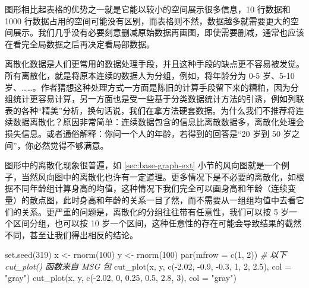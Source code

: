 \documentclass[
  b5paper,
  UTF8,twoside]{book}
\newenvironment{Shaded}{\begin{snugshade}}{\end{snugshade}}
\newcommand{\AttributeTok}[1]{\textcolor[rgb]{0.77,0.63,0.00}{#1}}
\newcommand{\CommentTok}[1]{\textcolor[rgb]{0.56,0.35,0.01}{\textit{#1}}}
\newcommand{\DecValTok}[1]{\textcolor[rgb]{0.00,0.00,0.81}{#1}}
\newcommand{\FloatTok}[1]{\textcolor[rgb]{0.00,0.00,0.81}{#1}}
\newcommand{\FunctionTok}[1]{\textcolor[rgb]{0.00,0.00,0.00}{#1}}
\newcommand{\NormalTok}[1]{#1}
\newcommand{\OtherTok}[1]{\textcolor[rgb]{0.56,0.35,0.01}{#1}}
\newcommand{\SpecialCharTok}[1]{\textcolor[rgb]{0.00,0.00,0.00}{#1}}
\newcommand{\StringTok}[1]{\textcolor[rgb]{0.31,0.60,0.02}{#1}}
\begin{document}
图形相比起表格的优势之一就是它能以较小的空间展示很多信息，10 行数据和 1000 行数据占用的空间可能没有区别，而表格则不然，数据越多就需要更大的空间展示。我们几乎没有必要刻意删减原始数据再画图，即使需要删减，通常也应该在看完全局数据之后再决定看局部数据。

离散化数据是人们更常用的数据处理手段，并且这种手段的缺点更不容易被发觉。所有离散化，就是将原本连续的数据人为分组，例如，将年龄分为 0-5 岁、5-10 岁、\ldots\ldots。作者猜想这种处理方式一方面是陈旧的计算手段留下来的糟粕，因为分组统计更容易计算，另一方面也是受一些基于分类数据统计方法的引诱，例如列联表的各种``精美''分析，换句话说，我们在拿方法硬套数据。为什么我们不推荐将连续数据离散化？原因非常简单：连续数据包含的信息比离散数据多，离散化处理会损失信息。或者通俗解释：你问一个人的年龄，若得到的回答是``20 岁到 50 岁之间''，你必然觉得不够满意。

图形中的离散化现象很普遍，如 \ref{sec:base-graph-ext} 小节的风向图就是一个例子，当然风向图中的离散化也许有一定道理。更多情况下是不必要的离散化，如根据不同年龄组计算身高的均值，这种情况下我们完全可以画身高和年龄（连续变量）的散点图，此时身高和年龄的关系一目了然，而不需要从一组组均值中去看它们的关系。更严重的问题是，离散化的分组往往带有任意性，我们可以按 5 岁一个区间分组，也可以按 10 岁一个区间，这种任意性的存在可能会导致结果的截然不同，甚至让我们得出相反的结论。

\begin{Shaded}
\begin{Highlighting}[]
\FunctionTok{set.seed}\NormalTok{(}\DecValTok{319}\NormalTok{)}
\NormalTok{x }\OtherTok{\textless{}{-}} \FunctionTok{rnorm}\NormalTok{(}\DecValTok{100}\NormalTok{)}
\NormalTok{y }\OtherTok{\textless{}{-}} \FunctionTok{rnorm}\NormalTok{(}\DecValTok{100}\NormalTok{)}
\FunctionTok{par}\NormalTok{(}\AttributeTok{mfrow =} \FunctionTok{c}\NormalTok{(}\DecValTok{1}\NormalTok{, }\DecValTok{2}\NormalTok{)) }\CommentTok{\# 以下 cut\_plot() 函数来自 MSG 包}
\FunctionTok{cut\_plot}\NormalTok{(x, y, }\FunctionTok{c}\NormalTok{(}\SpecialCharTok{{-}}\FloatTok{2.02}\NormalTok{, }\SpecialCharTok{{-}}\FloatTok{0.9}\NormalTok{, }\SpecialCharTok{{-}}\FloatTok{0.3}\NormalTok{, }\DecValTok{1}\NormalTok{, }\DecValTok{2}\NormalTok{, }\FloatTok{2.5}\NormalTok{), }\AttributeTok{col =} \StringTok{"gray"}\NormalTok{)}
\FunctionTok{cut\_plot}\NormalTok{(x, y, }\FunctionTok{c}\NormalTok{(}\SpecialCharTok{{-}}\FloatTok{2.02}\NormalTok{, }\DecValTok{0}\NormalTok{, }\FloatTok{0.25}\NormalTok{, }\FloatTok{0.5}\NormalTok{, }\FloatTok{2.8}\NormalTok{, }\DecValTok{3}\NormalTok{), }\AttributeTok{col =} \StringTok{"gray"}\NormalTok{)}
\end{Highlighting}
\end{Shaded}
\end{document}
